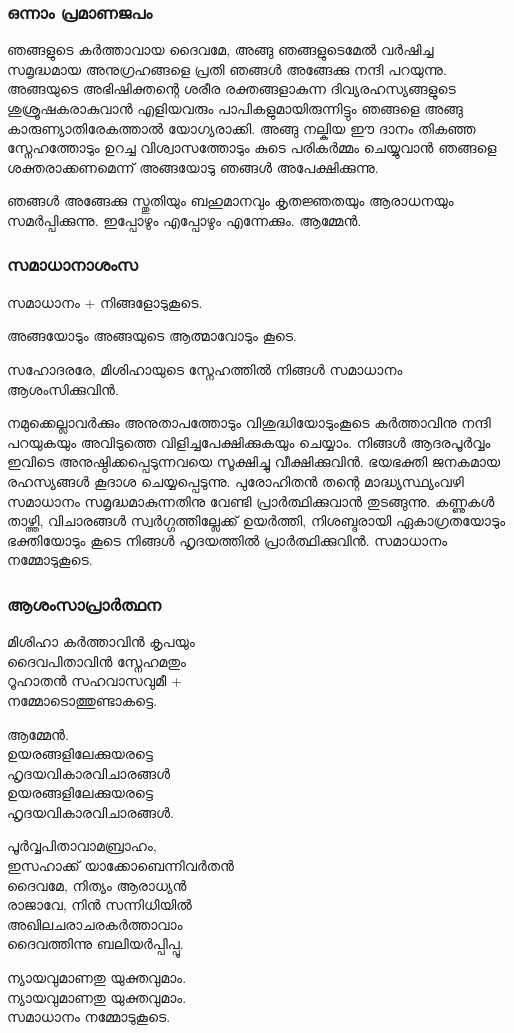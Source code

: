 \documentclass[20pt]{beamer}
\newcommand{\Priest}[1]{\color{white}#1}
\newcommand{\People}[1]{\color{yellow}#1}
\newcommand{\Server}[1]{\color{lightgray}#1}
\newcommand{\Ammen}{\People{ആമ്മേന്‍.}}
\newcommand{\Peace}{\Server{സമാധാനം നമ്മോടുകൂടെ.}}
\newcommand{\PPeace}{\Priest{സമാധാനം + നിങ്ങളോടുകൂടെ.}}
\begin{document}
\begin{frame}[allowframebreaks]
\frametitle{ഒന്നാം പ്രമാണജപം}
\Priest{
ഞങ്ങളുടെ കര്‍ത്താവായ ദൈവമേ, അങ്ങു ഞങ്ങളുടെമേല്‍
വര്‍ഷിച്ച സമൃദ്ധമായ അനുഗ്രഹങ്ങളെ പ്രതി ഞങ്ങള്‍ അങ്ങേക്കു 
നന്ദി പറയുന്നു. അങ്ങയുടെ അഭിഷിക്തന്റെ ശരീര രക്തങ്ങളാകുന്ന
ദിവ്യരഹസ്യങ്ങളുടെ ശുശ്രൂഷകരാകുവാന്‍ എളിയവരും
പാപികളുമായിരുന്നിട്ടും ഞങ്ങളെ അങ്ങു കാരുണ്യാതിരേകത്താല്‍
യോഗ്യരാക്കി. അങ്ങു നല്കിയ ഈ ദാനം തികഞ്ഞ സ്നേഹത്തോടും
ഉറച്ച വിശ്വാസത്തോടും കു‌ടെ പരികര്‍മ്മം ചെയ്യുവാന്‍ ഞങ്ങളെ
ശക്തരാക്കണമെന്ന് അങ്ങയോടു ഞങ്ങള്‍ അപേക്ഷിക്കുന്നു.\par
ഞങ്ങള്‍ അങ്ങേക്കു സ്തുതിയും ബഹുമാനവും കൃതജ്ഞതയും ആരാധനയും 
സമര്‍പ്പിക്കുന്നു. ഇപ്പോഴും എപ്പോഴും എന്നേക്കും. \Ammen}\\
\end{frame}

\begin{frame}
\frametitle{സമാധാനാശംസ}
\PPeace \par
\People{അങ്ങയോടും അങ്ങയുടെ ആത്മാവോടും കൂടെ.} \par
\Server{സഹോദരരേ, മിശിഹായുടെ സ്നേഹത്തില്‍ നിങ്ങള്‍ സമാധാനം ആശംസിക്കുവിന്‍.}
\end{frame}

\begin{frame}[allowframebreaks]
\Server{
നമുക്കെല്ലാവര്‍ക്കും അനുതാപത്തോടും വിശുദ്ധിയോടുംകൂടെ കര്‍ത്താവിനു
നന്ദി പറയുകയും അവിടുത്തെ വിളിച്ചപേക്ഷിക്കുകയും ചെയ്യാം.
നിങ്ങള്‍ ആദരപൂര്‍വ്വം ഇവിടെ അനുഷ്ഠിക്കപ്പെടുന്നവയെ സൂക്ഷിച്ചു 
വീക്ഷിക്കുവിന്‍. ഭയഭക്തി ജനകമായ രഹസ്യങ്ങള്‍ കൂദാശ ചെയ്യപ്പെടുന്നു.
പുരോഹിതന്‍ തന്റെ മാദ്ധ്യസ്ഥ്യംവഴി സമാധാനം സമൃദ്ധമാകുന്നതിനു
വേണ്ടി പ്രാര്‍ത്ഥിക്കുവാന്‍ തുടങ്ങുന്നു. കണ്ണുകള്‍ താഴ്ത്തി, വിചാരങ്ങള്‍ 
സ്വര്‍ഗ്ഗത്തില്ലേക്ക് ഉയര്‍ത്തി, നിശബ്ദരായി ഏകാഗ്രതയോടും
ഭക്തിയോടും കൂടെ നിങ്ങള്‍ ഹൃദയത്തില്‍ പ്രാര്‍ത്ഥിക്കുവിന്‍. \Peace}
\end{frame}

\begin{frame}[allowframebreaks]
\frametitle{ആശംസാപ്രാര്‍ത്ഥന}
\Priest{
മിശിഹാ കര്‍ത്താവിന്‍ കൃപയും\\
ദൈവപിതാവിന്‍ സ്നേഹമതും\\
റൂഹാതന്‍ സഹവാസവുമീ +\\
നമ്മോടൊത്തുണ്ടാകട്ടെ.}\par
\Ammen\\ \framebreak
\Priest{
ഉയരങ്ങളിലേക്കുയരട്ടെ\\
ഹൃദയവികാരവിചാരങ്ങള്‍\\
ഉയരങ്ങളിലേക്കുയരട്ടെ\\
ഹൃദയവികാരവിചാരങ്ങള്‍.}\par
\People{
പൂര്‍വ്വപിതാവാമബ്രാഹം,\\
ഇസഹാക്ക് യാക്കോബെന്നിവര്‍തന്‍\\
ദൈവമേ, നിത്യം ആരാധ്യന്‍ \\
രാജാവേ, നിന്‍ സന്നിധിയില്‍}\\ \framebreak
\Priest{
അഖിലചരാചരകർത്താവാം\\
ദൈവത്തിന്നു ബലിയർപ്പിപ്പൂ.}\par
\People{
ന്യായവുമാണതു യുക്തവുമാം.\\
ന്യായവുമാണതു യുക്തവുമാം.}\\[2\baselineskip]
\Peace
\end{frame}
\end{document}
